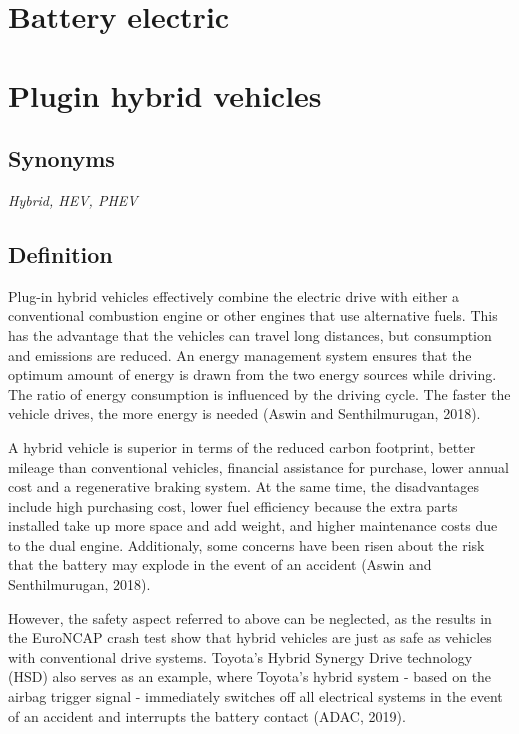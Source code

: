 \documentclass[
]{book}
\begin{document}
\hypertarget{battery-electric}{%
\section{Battery electric}\label{battery-electric}}

\hypertarget{plugin-hybrid-vehicles}{%
\section{Plugin hybrid vehicles}\label{plugin-hybrid-vehicles}}

\hypertarget{synonyms-9}{%
\subsection*{Synonyms}\label{synonyms-9}}

\emph{Hybrid, HEV, PHEV}

\hypertarget{definition-10}{%
\subsection*{Definition}\label{definition-10}}

Plug-in hybrid vehicles effectively combine the electric drive with either a conventional combustion engine or other engines that use alternative fuels. This has the advantage that the vehicles can travel long distances, but consumption and emissions are reduced. An energy management system ensures that the optimum amount of energy is drawn from the two energy sources while driving. The ratio of energy consumption is influenced by the driving cycle. The faster the vehicle drives, the more energy is needed (Aswin and Senthilmurugan, 2018).

A hybrid vehicle is superior in terms of the reduced carbon footprint, better mileage than conventional vehicles, financial assistance for purchase, lower annual cost and a regenerative braking system. At the same time, the disadvantages include high purchasing cost, lower fuel efficiency because the extra parts installed take up more space and add weight, and higher maintenance costs due to the dual engine. Additionaly, some concerns have been risen about the risk that the battery may explode in the event of an accident (Aswin and Senthilmurugan, 2018).

However, the safety aspect referred to above can be neglected, as the results in the EuroNCAP crash test show that hybrid vehicles are just as safe as vehicles with conventional drive systems. Toyota's Hybrid Synergy Drive technology (HSD) also serves as an example, where Toyota's hybrid system - based on the airbag trigger signal - immediately switches off all electrical systems in the event of an accident and interrupts the battery contact (ADAC, 2019).
\end{document}

